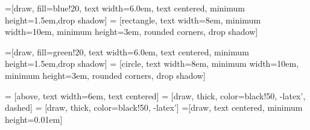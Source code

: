 \usetikzlibrary{shadows,arrows}
 
=[draw, fill=blue!20, text width=6.0em, text centered,
  minimum height=1.5em,drop shadow]
 = [rectangle, text width=8em, minimum width=10em,
  minimum height=3em, rounded corners, drop shadow]

=[draw, fill=green!20, text width=6.0em, text centered,
  minimum height=1.5em,drop shadow]
 = [circle, text width=8em, minimum width=10em,
  minimum height=3em, rounded corners, drop shadow]
 
 = [above, text width=6em, text centered]
 = [draw, thick, color=black!50, -latex', dashed]
 = [draw, thick, color=black!50, -latex']
=[draw, text centered, minimum height=0.01em]
 
\newcommand{\blockdist}{1.3}
\newcommand{\edgedist}{1.5}

\newcommand{\practica}[3]{node (p#1) [practica] {#2 \\ \scriptsize\textit{#3}}}
\newcommand{\implemented}[3]{node (p#1) [interface] {#2 \\ \scriptsize\textit{#3}}}

\newcommand{\background}[5]{%
  \begin{pgfonlayer}{background}
    \path (#1.west |- #2.north)+(-0.5,0.5) node (a1) {};
    \path (#3.east |- #4.south)+(+0.5,-0.25) node (a2) {};
    \path[fill=yellow!20,rounded corners, draw=black!50, dashed]
      (a1) rectangle (a2);
    \path (a1.east |- a1.south)+(0.8,-0.3) node (u1)[texto]
      {\scriptsize\textit{#5}};
  \end{pgfonlayer}}

\newcommand{\transreceptor}[3]{%
  \path [linepart] (#1.east) -- node [above]
    {\scriptsize Transreceptor #2} (#3);}

